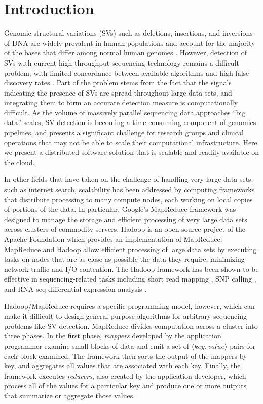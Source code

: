 \documentclass[11pt]{article}
\begin{document}
\section{Introduction}

Genomic structural variations (SVs) such as deletions, insertions, and inversions of DNA are widely prevalent in human populations and account for the majority of the bases that differ among normal human genomes \autocite{Mills:2011p1611, Conrad:2010ja}. However, detection of SVs with current high-throughput sequencing technology remains a difficult problem, with limited concordance between available algorithms and high false discovery rates \autocite{Mills:2011p1611}. Part of the problem stems from the fact that the signals indicating the presence of SVs are spread throughout large data sets, and integrating them to form an accurate detection measure is computationally difficult. As the volume of massively parallel sequencing data approaches ``big data'' scales, SV detection is becoming a time consuming component of genomics pipelines, and presents a significant challenge for research groups and clinical operations that may not be able to scale their computational infrastructure. Here we present a distributed software solution that is scalable and readily available on the cloud.

In other fields that have taken on the challenge of handling very large data sets, such as internet search, scalability has been addressed by computing frameworks that distribute processing to many compute nodes, each working on local copies of portions of the data. In particular, Google's MapReduce \autocite{Dean:2008p277} framework was designed to manage the storage and efficient processing of very large data sets across clusters of commodity servers. Hadoop is an open source project of the Apache Foundation which provides an implementation of MapReduce. MapReduce and Hadoop allow efficient processing of large data sets by executing tasks on nodes that are as close as possible the data they require, minimizing network traffic and I/O contention. The Hadoop framework has been shown to be effective in sequencing-related tasks including short read mapping \autocite{Schatz:2009p278}, SNP calling \autocite{Langmead:2009p1225}, and RNA-seq differential expression analysis \autocite{Langmead:2010p1268}.

Hadoop/MapReduce requires a specific programming model, however, which can make it difficult to design general-purpose algorithms for arbitrary sequencing problems like SV detection. MapReduce divides computation across a cluster into three phases. In the first phase, \emph{mappers} developed by the application programmer examine small blocks of data and emit a set of $\langle key, value \rangle$ pairs for each block examined. The framework then sorts the output of the mappers by key, and aggregates all values that are associated with each key. Finally, the framework executes \emph{reducers}, also created by the application developer, which process all of the values for a particular key and produce one or more outputs that summarize or aggregate those values.
\end{document}
